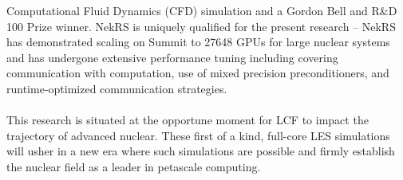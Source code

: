 \documentclass[11pt,letterpaper,english]{article}
\begin{document}
Computational Fluid Dynamics (CFD) simulation and a Gordon Bell and R\&D 100
Prize winner. NekRS is uniquely qualified for the present research -- NekRS has
demonstrated scaling on Summit to 27648 GPUs for large nuclear systems and
has undergone extensive performance tuning
 including covering communication with computation, use of mixed precision preconditioners,
 and runtime-optimized communication strategies.\\
 \\
 This research is situated at the opportune moment for LCF to 
 impact the trajectory of advanced nuclear. These first of a kind, full-core LES simulations
 will usher in a new era where such simulations are possible
 and firmly establish the nuclear field as a leader in petascale computing.
\end{document}
